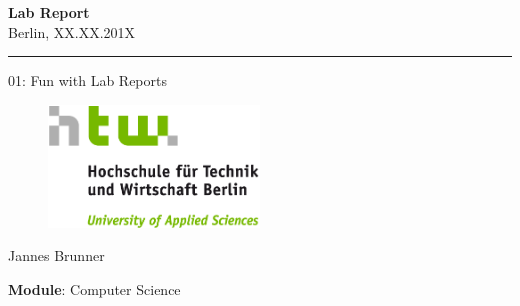\documentclass[12pt,a4paper,bibtotoc]{scrartcl}
\begin{document}
	\begin{titlepage}
		\begin{center}
			{\LARGE \bf Lab Report}\\[4mm]
			{\large Berlin, XX.XX.201X}
			\vspace{0.5cm} \hrule \vspace{0.6cm}
			{\huge \bf \begin{onehalfspace}01: Fun with Lab Reports \end{onehalfspace}}
			\vspace{0.8cm}
			\begin{figure}[h!]
			\centering
			\includegraphics[width=0.5\textwidth]{images/HTW_Logo_rgb.png}
			\end{figure}
			\vspace{0.8cm}
			\large {Jannes Brunner}
		\end{center}
		\vspace{0.6cm}
		{\bf Module}: Computer Science
\end{titlepage}

\newpage
{}
\tableofcontents 
\newpage
{}
\pagestyle{fancy}
\renewcommand{\headrulewidth}{0.4pt}





\end{document}
